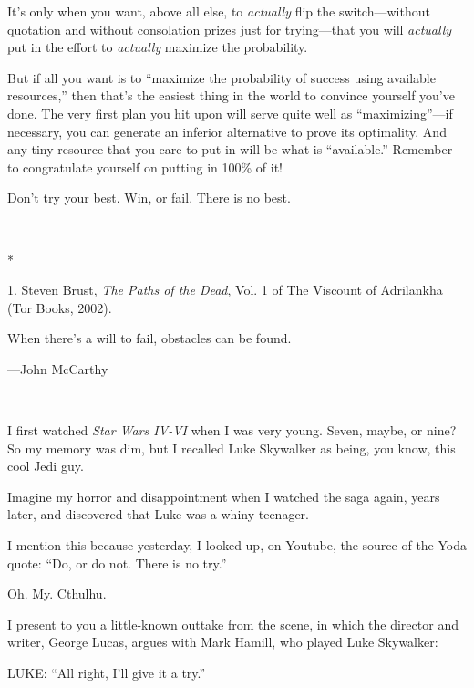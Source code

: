 {
 It's only when you want, above all else, to
\textit{actually} flip the switch---without quotation and without
consolation prizes just for trying---that you will \textit{actually}
put in the effort to \textit{actually} maximize the probability.}

{
 But if all you want is to ``maximize the
probability of success using available resources,''
then that's the easiest thing in the world to convince
yourself you've done. The very first plan you hit upon
will serve quite well as
``maximizing''---if necessary, you
can generate an inferior alternative to prove its optimality. And any
tiny resource that you care to put in will be what is
``available.'' Remember to
congratulate yourself on putting in 100\% of it!}

{
 Don't try your best. Win, or fail. There is no
best.}

{\centering
 \ ~
\par}

{\centering
 *
\par}


\bigskip

{
 1. Steven Brust, \textit{The Paths of the Dead}, Vol. 1 of The
Viscount of Adrilankha (Tor Books, 2002).}


{
 When there's a will to fail, obstacles can be
found.}

{\raggedleft
 {}---John McCarthy
\par}


\bigskip

{
 ~}

{
 I first watched \textit{Star Wars IV-VI} when I was very young.
Seven, maybe, or nine? So my memory was dim, but I recalled Luke
Skywalker as being, you know, this cool Jedi guy.}

{
 Imagine my horror and disappointment when I watched the saga
again, years later, and discovered that Luke was a whiny teenager.}

{
 I mention this because yesterday, I looked up, on Youtube, the
source of the Yoda quote: ``Do, or do not. There is no
try.''}

{
 Oh. My. Cthulhu.}

{
 I present to you a little-known outtake from the scene, in which
the director and writer, George Lucas, argues with Mark Hamill, who
played Luke Skywalker:}

{
 LUKE: ``All right, I'll give it a
try.''}

